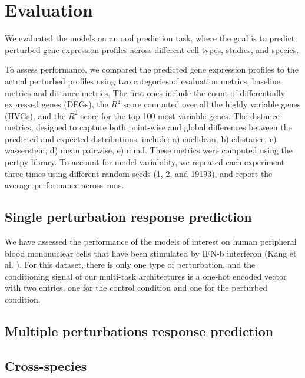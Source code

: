 \documentclass[12pt, a4paper]{article}
\begin{document}
\section{Evaluation}




We evaluated the models on an \gls{ood} prediction task, where the goal is to predict perturbed gene expression profiles across different cell types, studies, and species.

To assess performance, we compared the predicted gene expression profiles to the actual perturbed profiles using two categories of evaluation metrics, baseline metrics and distance metrics. The first ones include the count of differentially expressed genes (DEGs), the $R^2$ score computed over all the highly variable genes (HVGs), and the $R^2$ score for the top 100 most variable genes. The distance metrics, designed to capture both point-wise and global differences between the predicted and expected distributions, include: a) euclidean, b) edistance, c) wasserstein, d) mean pairwise, e) mmd. These metrics were computed using the pertpy \cite{heumos2024pertpy} library.
To account for model variability, we repeated each experiment three times using different random seeds (1, 2, and 19193), and report the average performance across runs.

\subsection{Single perturbation response prediction}

We have assessed the performance of the models of interest on human peripheral blood mononuclear cells that have been stimulated by IFN-b interferon (Kang et al. \cite{kanaGenerativeModelingSinglecell2023}). For this dataset, there is only one type of perturbation, and the conditioning signal of our multi-task architectures is a one-hot encoded vector with two entries, one for the control condition and one for the perturbed condition.

\subsection{Multiple perturbations response prediction}

\subsection{Cross-species}
\end{document}
